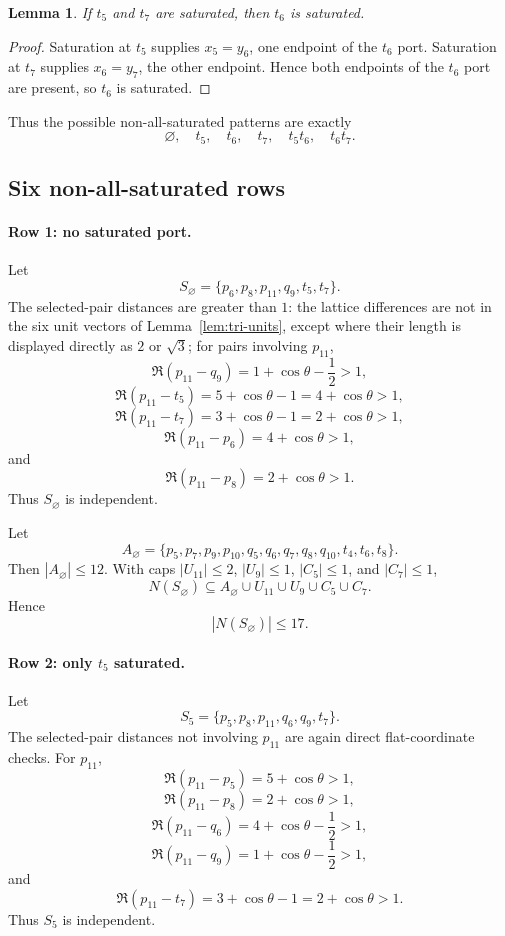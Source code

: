 \documentclass[11pt]{article}
\newtheorem{lemma}{Lemma}
\begin{document}
\begin{lemma}\label{lem:t5t7-implies-t6}
If $t_5$ and $t_7$ are saturated, then $t_6$ is saturated.
\end{lemma}

\begin{proof}
Saturation at $t_5$ supplies $x_5=y_6$, one endpoint of the $t_6$ port. Saturation at $t_7$ supplies $x_6=y_7$, the other endpoint. Hence both endpoints of the $t_6$ port are present, so $t_6$ is saturated.
\end{proof}

Thus the possible non-all-saturated patterns are exactly
\[
  \varnothing,
  \quad t_5,
  \quad t_6,
  \quad t_7,
  \quad t_5t_6,
  \quad t_6t_7.
\]

\subsection{Six non-all-saturated rows}

\paragraph{Row 1: no saturated port.}
Let
\[
  S_{\varnothing}=\{p_6,p_8,p_{11},q_9,t_5,t_7\}.
\]
The selected-pair distances are greater than $1$: the lattice differences are not in the six unit vectors of Lemma~\ref{lem:tri-units}, except where their length is displayed directly as $2$ or $\sqrt3$; for pairs involving $p_{11}$,
\[
\Re(p_{11}-q_9)=1+\cos\theta-\frac12>1,
\]
\[
\Re(p_{11}-t_5)=5+\cos\theta-1=4+\cos\theta>1,
\]
\[
\Re(p_{11}-t_7)=3+\cos\theta-1=2+\cos\theta>1,
\]
\[
\Re(p_{11}-p_6)=4+\cos\theta>1,
\]
and
\[
\Re(p_{11}-p_8)=2+\cos\theta>1.
\]
Thus $S_{\varnothing}$ is independent.

Let
\[
A_{\varnothing}=\{p_5,p_7,p_9,p_{10},q_5,q_6,q_7,q_8,q_{10},t_4,t_6,t_8\}.
\]
Then $|A_{\varnothing}|\le12$. With caps $|U_{11}|\le2$, $|U_9|\le1$, $|C_5|\le1$, and $|C_7|\le1$,
\[
N(S_{\varnothing})\subseteq A_{\varnothing}\cup U_{11}\cup U_9\cup C_5\cup C_7.
\]
Hence
\[
  |N(S_{\varnothing})|\le17.
\]

\paragraph{Row 2: only $t_5$ saturated.}
Let
\[
  S_5=\{p_5,p_8,p_{11},q_6,q_9,t_7\}.
\]
The selected-pair distances not involving $p_{11}$ are again direct flat-coordinate checks. For $p_{11}$,
\[
\Re(p_{11}-p_5)=5+\cos\theta>1,
\]
\[
\Re(p_{11}-p_8)=2+\cos\theta>1,
\]
\[
\Re(p_{11}-q_6)=4+\cos\theta-\frac12>1,
\]
\[
\Re(p_{11}-q_9)=1+\cos\theta-\frac12>1,
\]
and
\[
\Re(p_{11}-t_7)=3+\cos\theta-1=2+\cos\theta>1.
\]
Thus $S_5$ is independent.
\end{document}
